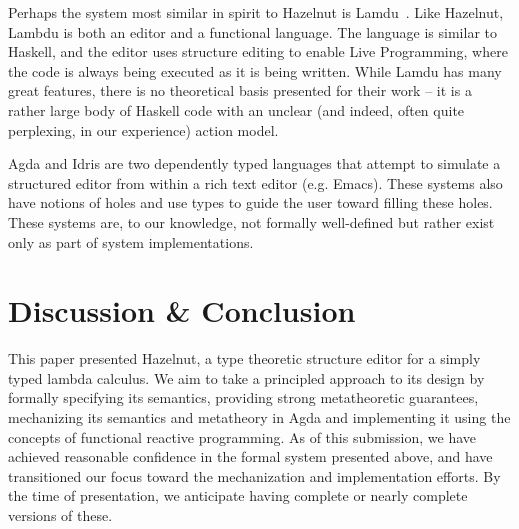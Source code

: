 \documentclass{llncs}
\begin{document}
Perhaps the system most similar in spirit to Hazelnut is Lamdu~\cite{lamdu}. Like Hazelnut, Lambdu is both an editor and a functional language. The language is similar to Haskell, and the editor uses structure editing to enable Live Programming, where the code is always being executed as it is being written.
While Lamdu has many great features, there is no theoretical basis presented for their work -- it is a rather large body of Haskell code with an unclear (and indeed, often quite perplexing, in our experience) action model. 

Agda and Idris are two dependently typed languages that attempt to simulate a structured editor from within a rich text editor (e.g. Emacs). These systems also have notions of holes and use types to guide the user toward filling these holes. These  systems are, to our knowledge, not formally well-defined but rather exist only as part of system implementations. 





%
%



\section{Discussion \& Conclusion}
\label{sec:future}
This paper presented Hazelnut, a type theoretic structure editor for a simply typed lambda calculus. We aim to take a principled approach to its design by formally specifying its semantics, providing strong metatheoretic guarantees, mechanizing its semantics and metatheory in Agda and implementing it using the concepts of  functional reactive programming. As of this submission, we have achieved reasonable confidence in the formal system presented above, and have transitioned our focus toward the mechanization and implementation efforts. By the time of presentation, we anticipate having complete or nearly complete versions of these. 
\end{document}
